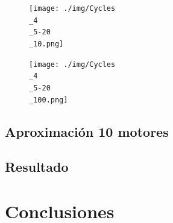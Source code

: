 \documentclass[12pt, spanish, pdftex]{UC3M_document}
\begin{document}
\begin{figure}[H]
	{\texttt{[image: ./img/Cycles\\\_4\\\_5-20\\\_10.png]}}
\end{figure}
\begin{figure}[H]
	{\texttt{[image: ./img/Cycles\\\_4\\\_5-20\\\_100.png]}}
\end{figure}

\subsection{Aproximación 10 motores}


\subsection{Resultado}


\section{Conclusiones}
\end{document}
